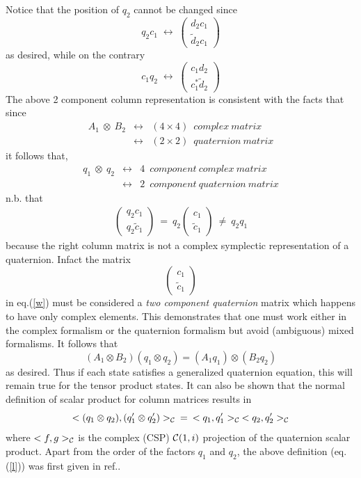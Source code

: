 Notice that the position of $q_{2}$ cannot be changed since
\[ q_{2} c_{1} \; \leftrightarrow \;  \left( \begin{array}{c} d_{2}c_{1}\\
\tilde{d}_{2}c_{1} \end{array} \right) \]
as desired, while on the contrary
\[ c_{1} q_{2} \; \leftrightarrow \;  \left( \begin{array}{c} c_{1}d_{2} \\
c_{1}^{*}\tilde{d}_{2}  \end{array} \right) \]
The above 2 component column representation is consistent with the
facts that since
\begin{eqnarray*}
A_{1} \: \otimes \: B_{2} & \leftrightarrow & ( 4 \times 4 ) \; \: complex \:
matrix \\
 & \leftrightarrow &  ( 2 \times 2 ) \; \: quaternion \: matrix
\end{eqnarray*}
it follows that,
\begin{eqnarray*}
q_{1} \: \otimes \: q_{2} & \leftrightarrow & 4 \; \: component \: complex \:
matrix \\
 & \leftrightarrow & 2 \; \: component \: quaternion \: matrix
\end{eqnarray*}
n.b. that
\begin{eqnarray} \label{w}
\left( \begin{array}{c} q_{2}c_{1}\\
q_{2}\tilde{c}_{1} \end{array} \right) \: = \: q_{2} \left( \begin{array}{c}
c_{1}\\ \tilde{c}_{1} \end{array} \right) \: \neq \: q_{2}q_{1}
\end{eqnarray}
because the right column matrix is not a complex symplectic representation
of a quaternion. Infact the matrix
\[ \left( \begin{array}{c}
c_{1}\\ \tilde{c}_{1} \end{array} \right) \]
in eq.(\ref{w}) must be considered
a {\em two component quaternion} matrix which
happens to have only complex elements. This demonstrates that one must work
either in the complex formalism or the quaternion formalism but avoid
(ambiguous) mixed formalisms. It follows that
\[ (A_{1} \otimes B_{2})(q_{1} \otimes q_{2}) =
(A_{1}q_{1}) \otimes (B_{2}q_{2}) \]
as desired. Thus if each state satisfies a generalized quaternion equation,
this will remain true for the tensor product states. It can also be shown
that the normal definition of scalar product for column matrices results in
\begin{equation}
<(q_{1} \otimes q_{2}),(q^{\prime}_{1} \otimes q^{\prime}_{2})>_{\cal C} \;
\: = \; \: <q_{1},q^{\prime}_{1}>_{\cal C}
\: <q_{2},q^{\prime}_{2}>_{\cal C}
\end{equation}
where $<f,g>_{\cal C}$ is the complex (CSP) ${\cal C}(1,i)$ projection of the
quaternion scalar product. Apart from the order of the factors $q_{1}$ and
$q_{2}$, the above definition (eq.(\ref{l})) was first given
in ref.\cite{del2}.

